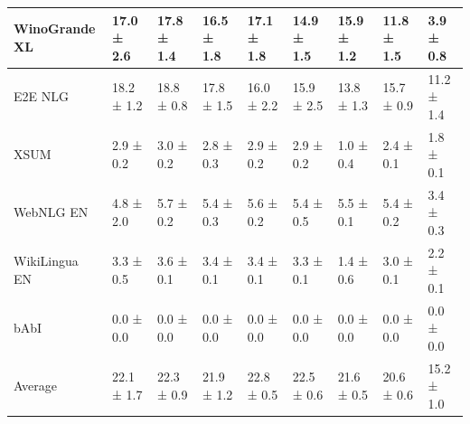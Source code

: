 \documentclass{article}
\begin{document}
\begin{table}[htbp]
{\begin{tabular}{l|llllllll}
WinoGrande XL & 17.0 ± 2.6 & 17.8 ± 1.4 & 16.5 ± 1.8 & 17.1 ± 1.8 & 14.9 ± 1.5 & 15.9 ± 1.2 & 11.8 ± 1.5 & 3.9 ± 0.8 \\
\midrule
E2E NLG & 18.2 ± 1.2 & 18.8 ± 0.8 & 17.8 ± 1.5 & 16.0 ± 2.2 & 15.9 ± 2.5 & 13.8 ± 1.3 & 15.7 ± 0.9 & 11.2 ± 1.4 \\
XSUM & 2.9 ± 0.2 & 3.0 ± 0.2 & 2.8 ± 0.3 & 2.9 ± 0.2 & 2.9 ± 0.2 & 1.0 ± 0.4 & 2.4 ± 0.1 & 1.8 ± 0.1 \\
WebNLG EN & 4.8 ± 2.0 & 5.7 ± 0.2 & 5.4 ± 0.3 & 5.6 ± 0.2 & 5.4 ± 0.5 & 5.5 ± 0.1 & 5.4 ± 0.2 & 3.4 ± 0.3 \\
WikiLingua EN & 3.3 ± 0.5 & 3.6 ± 0.1 & 3.4 ± 0.1 & 3.4 ± 0.1 & 3.3 ± 0.1 & 1.4 ± 0.6 & 3.0 ± 0.1 & 2.2 ± 0.1 \\
\midrule
bAbI & 0.0 ± 0.0 & 0.0 ± 0.0 & 0.0 ± 0.0 & 0.0 ± 0.0 & 0.0 ± 0.0 & 0.0 ± 0.0 & 0.0 ± 0.0 & 0.0 ± 0.0 \\
\midrule
Average & 22.1 ± 1.7 & 22.3 ± 0.9 & 21.9 ± 1.2 & 22.8 ± 0.5 & 22.5 ± 0.6 & 21.6 ± 0.5 & 20.6 ± 0.6 & 15.2 ± 1.0 \\
\bottomrule
  \end{tabular}
  }
  \label{tab:4b2rep}
\end{table}
\end{document}
